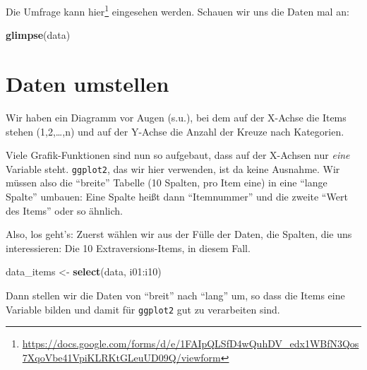 \documentclass[12pt,ngerman,]{book}
\makeatletter
\newenvironment{Shaded}{\begin{snugshade}}{\end{snugshade}}
\newcommand{\KeywordTok}[1]{\textcolor[rgb]{0.13,0.29,0.53}{\textbf{{#1}}}}
\newcommand{\DataTypeTok}[1]{\textcolor[rgb]{0.13,0.29,0.53}{{#1}}}
\newcommand{\StringTok}[1]{\textcolor[rgb]{0.31,0.60,0.02}{{#1}}}
\newcommand{\NormalTok}[1]{{#1}}
\let\rmarkdownfootnote\footnote%
\def\footnote{\protect\rmarkdownfootnote}
\newenvironment{kframe}{%
\medskip{}
\setlength{\fboxsep}{.8em}
 \def\at@end@of@kframe{}%
 \ifinner\ifhmode%
  \def\at@end@of@kframe{\end{minipage}}%
  \begin{minipage}{\columnwidth}%
 \fi\fi%
 \def\FrameCommand##1{\hskip\@totalleftmargin \hskip-\fboxsep
 \colorbox{shadecolor}{##1}\hskip-\fboxsep
     \hskip-\linewidth \hskip-\@totalleftmargin \hskip\columnwidth}%
 \MakeFramed {\advance\hsize-\width
   \@totalleftmargin\z@ \linewidth\hsize
   \@setminipage}}%
 {\par\unskip\endMakeFramed%
 \at@end@of@kframe}
\renewenvironment{Shaded}{\begin{kframe}}{\end{kframe}}
\theoremstyle{definition}
\theoremstyle{definition}
\theoremstyle{remark}
\makeatother
\begin{document}
Die Umfrage kann hier\footnote{\url{https://docs.google.com/forms/d/e/1FAIpQLSfD4wQuhDV_edx1WBfN3Qos7XqoVbe41VpiKLRKtGLeuUD09Q/viewform}}
eingesehen werden. Schauen wir uns die Daten mal an:

\begin{Shaded}
\begin{Highlighting}[]
\KeywordTok{glimpse}\NormalTok{(data)}
\end{Highlighting}
\end{Shaded}

\section{Daten umstellen}\label{daten-umstellen}

Wir haben ein Diagramm vor Augen (s.u.), bei dem auf der X-Achse die
Items stehen (1,2,\ldots{},n) und auf der Y-Achse die Anzahl der Kreuze
nach Kategorien.

Viele Grafik-Funktionen sind nun so aufgebaut, dass auf der X-Achsen nur
\emph{eine} Variable steht. \texttt{ggplot2}, das wir hier verwenden,
ist da keine Ausnahme. Wir müssen also die ``breite'' Tabelle (10
Spalten, pro Item eine) in eine ``lange Spalte'' umbauen: Eine Spalte
heißt dann ``Itemnummer'' und die zweite ``Wert des Items'' oder so
ähnlich.

Also, los geht's: Zuerst wählen wir aus der Fülle der Daten, die
Spalten, die uns interessieren: Die 10 Extraversions-Items, in diesem
Fall.

\begin{Shaded}
\begin{Highlighting}[]
\NormalTok{data_items <-}\StringTok{ }\KeywordTok{select}\NormalTok{(data, i01:i10)}
\end{Highlighting}
\end{Shaded}

Dann stellen wir die Daten von ``breit'' nach ``lang'' um, so dass die
Items eine Variable bilden und damit für \texttt{ggplot2} gut zu
verarbeiten sind.

\begin{Shaded}
\end{Shaded}
\end{document}
